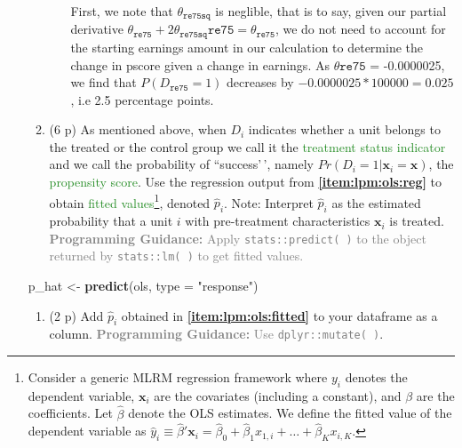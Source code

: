 \documentclass[
]{article}
\newenvironment{Shaded}{\begin{snugshade}}{\end{snugshade}}
\newcommand{\AttributeTok}[1]{\textcolor[rgb]{0.13,0.29,0.53}{#1}}
\newcommand{\FunctionTok}[1]{\textcolor[rgb]{0.13,0.29,0.53}{\textbf{#1}}}
\newcommand{\NormalTok}[1]{#1}
\newcommand{\OtherTok}[1]{\textcolor[rgb]{0.56,0.35,0.01}{#1}}
\newcommand{\StringTok}[1]{\textcolor[rgb]{0.31,0.60,0.02}{#1}}
\providecommand{\tightlist}{%
  \setlength{\itemsep}{0pt}\setlength{\parskip}{0pt}}
\begin{document}
\begin{enumerate}
\begin{enumerate}
\begin{enumerate}
      First, we note that \(\theta_{\texttt{re75sq}}\) is neglible, that
      is to say, given our partial derivative
      \(\theta_{\texttt{re75}} + 2\theta_{\texttt{re75sq}}\texttt{re75} = \theta_{\texttt{re75}}\),
      we do not need to account for the starting earnings amount in our
      calculation to determine the change in pscore given a change in
      earnings. As \(\theta{\texttt{re75}}\) = -0.0000025, we find that
      \(P(D_\texttt{re75}=1)\) decreases by
      \(-0.0000025 * 100000 = 0.025\), i.e 2.5 percentage points.
    \end{enumerate}
  \item
    (6 p) As mentioned above, when \(D_i\) indicates whether a unit
    belongs to the treated or the control group we call it the
    \textcolor{ForestGreen}{treatment status indicator} and we call the
    probability of ``success'\,', namely
    \(Pr(D_i=1|\mathbf{x}_i=\mathbf{x})\), the
    \textcolor{ForestGreen}{propensity score}. Use the regression output
    from \textbf{\ref{item:lpm:ols:reg}} to obtain
    \textcolor{ForestGreen}{fitted values}\footnote{Consider a generic MLRM regression framework where $y_i$ denotes the dependent variable, $\mathbf{x}_i$ are the covariates (including a constant), and $\beta$ are the coefficients. Let $\hat{\beta}$ denote the OLS estimates. We define the fitted value of the dependent variable as $\hat{y}_i \equiv \hat{\beta}'\mathbf{x}_i = \hat{\beta}_0 + \hat{\beta}_1 x_{1,i}+\ldots+\hat{\beta}_K x_{i,K}$.},
    denoted \(\hat{p}_i\). Note: Interpret \(\hat{p}_i\) as the
    estimated probability that a unit \(i\) with pre-treatment
    characteristics \(\mathbf{x}_i\) is treated.
    \textcolor{gray}{\textbf{Programming Guidance:} Apply \texttt{stats::predict( )} to the object returned by \texttt{stats::lm( )} to get fitted values.}\label{item:lpm:ols:fitted}
  \end{enumerate}

\begin{Shaded}
\begin{Highlighting}[]
\NormalTok{p\_hat }\OtherTok{\textless{}{-}} \FunctionTok{predict}\NormalTok{(ols, }\AttributeTok{type =} \StringTok{"response"}\NormalTok{)}
\end{Highlighting}
\end{Shaded}

  \begin{enumerate}
  \def\labelenumii{\alph{enumii}.}
  \setcounter{enumii}{3}
  \tightlist
  \item
    (2 p) Add \(\hat{p}_i\) obtained in
    \textbf{\ref{item:lpm:ols:fitted}} to your dataframe as a column.
    \textcolor{gray}{\textbf{Programming Guidance:} Use \texttt{dplyr::mutate( )}}.
  \end{enumerate}


\end{enumerate}
\end{document}
